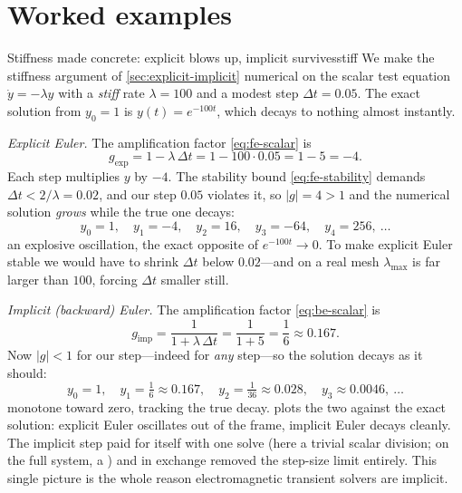 \section{Worked examples}

\begin{workedexample}{Stiffness made concrete: explicit blows up, implicit
survives}{stiff}
We make the stiffness argument of \cref{sec:explicit-implicit} numerical on the
scalar test equation $\dot y = -\lambda y$ with a \emph{stiff} rate $\lambda = 100$
and a modest step $\Delta t = 0.05$. The exact solution from $y_0 = 1$ is
$y(t) = e^{-100 t}$, which decays to nothing almost instantly.

\medskip
\emph{Explicit Euler.} The amplification factor \cref{eq:fe-scalar} is
\[
  g_{\text{exp}} = 1 - \lambda\,\Delta t = 1 - 100\cdot 0.05 = 1 - 5 = -4.
\]
Each step multiplies $y$ by $-4$. The stability bound \cref{eq:fe-stability} demands
$\Delta t < 2/\lambda = 0.02$, and our step $0.05$ violates it, so $|g| = 4 > 1$ and
the numerical solution \emph{grows} while the true one decays:
\[
  y_0 = 1,\quad y_1 = -4,\quad y_2 = 16,\quad y_3 = -64,\quad y_4 = 256,\ \dots
\]
an explosive oscillation, the exact opposite of $e^{-100t}\to 0$. To make explicit
Euler stable we would have to shrink $\Delta t$ below $0.02$---and on a real mesh
$\lambda_{\max}$ is far larger than $100$, forcing $\Delta t$ smaller still.

\medskip
\emph{Implicit (backward) Euler.} The amplification factor \cref{eq:be-scalar} is
\[
  g_{\text{imp}} = \frac{1}{1 + \lambda\,\Delta t} = \frac{1}{1 + 5} = \frac{1}{6}
  \approx 0.167.
\]
Now $|g| < 1$ for our step---indeed for \emph{any} step---so the solution decays as
it should:
\[
  y_0 = 1,\quad y_1 = \tfrac16 \approx 0.167,\quad y_2 = \tfrac1{36} \approx 0.028,
  \quad y_3 \approx 0.0046,\ \dots
\]
monotone toward zero, tracking the true decay.  plots the two
against the exact solution: explicit Euler oscillates out of the frame, implicit
Euler decays cleanly. The implicit step paid for itself with one solve (here a
trivial scalar division; on the full system, a ) and in exchange
removed the step-size limit entirely. This single picture is the whole reason
electromagnetic transient solvers are implicit.
\end{workedexample}

